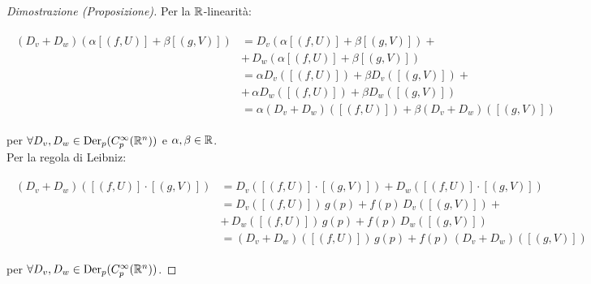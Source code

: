 \begin{proof}[Dimostrazione (Proposizione)]
	Per la $ \mathbb{R} $-linearità:
	
	\begin{align}
		\begin{split}
			(D_{v} + D_{w}) (\alpha [(f,U)] + \beta [(g,V)]) &= D_{v} (\alpha [(f,U)] + \beta [(g,V)]) +\\
			&+ \, D_{w} (\alpha [(f,U)] + \beta [(g,V)])\\
			&= \alpha D_{v} ([(f,U)]) + \beta D_{v} ([(g,V)]) +\\
			&+ \,\alpha D_{w} ([(f,U)]) + \beta D_{w} ([(g,V)])\\
			&= \alpha (D_{v} + D_{w}) ([(f,U)]) + \beta (D_{v} + D_{w}) ([(g,V)])
		\end{split}
	\end{align}

	per $ \forall D_{v}, D_{w} \in \operatorname{Der}_{p}(C_{p}^{\infty}(\mathbb{R}^{n})) $ e $ \alpha,\beta \in \mathbb{R} $.\\
	Per la regola di Leibniz:
	
	\begin{align}
		\begin{split}
			(D_{v} + D_{w}) ([(f,U)] \cdot [(g,V)]) &= D_{v} ([(f,U)] \cdot [(g,V)]) + D_{w} ([(f,U)] \cdot [(g,V)])\\
			&= D_{v} ([(f,U)]) \, g(p) + f(p) \, D_{v} ([(g,V)]) +\\
			&+ \, D_{w} ([(f,U)]) \, g(p) + f(p) \, D_{w} ([(g,V)])\\
			&= (D_{v} + D_{w}) ([(f,U)]) \, g(p) + f(p) \, (D_{v} + D_{w}) ([(g,V)])
		\end{split}
	\end{align}

	per $ \forall D_{v}, D_{w} \in \operatorname{Der}_{p}(C_{p}^{\infty}(\mathbb{R}^{n})) $.
\end{proof}

